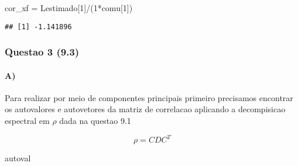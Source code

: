 \documentclass[
]{article}
\newenvironment{Shaded}{\begin{snugshade}}{\end{snugshade}}
\newcommand{\AttributeTok}[1]{\textcolor[rgb]{0.77,0.63,0.00}{#1}}
\newcommand{\DecValTok}[1]{\textcolor[rgb]{0.00,0.00,0.81}{#1}}
\newcommand{\FunctionTok}[1]{\textcolor[rgb]{0.00,0.00,0.00}{#1}}
\newcommand{\NormalTok}[1]{#1}
\newcommand{\OtherTok}[1]{\textcolor[rgb]{0.56,0.35,0.01}{#1}}
\newcommand{\SpecialCharTok}[1]{\textcolor[rgb]{0.00,0.00,0.00}{#1}}
\begin{document}
\begin{Shaded}
\begin{Highlighting}[]
\NormalTok{cor\_xf }\OtherTok{=}\NormalTok{ Lestimado[}\DecValTok{1}\NormalTok{]}\SpecialCharTok{/}\NormalTok{(}\DecValTok{1}\SpecialCharTok{*}\NormalTok{comu[}\DecValTok{1}\NormalTok{])}
\end{Highlighting}
\end{Shaded}

\begin{verbatim}
## [1] -1.141896
\end{verbatim}

\newpage

\hypertarget{questao-3-9.3}{%
\subsubsection{Questao 3 (9.3)}\label{questao-3-9.3}}

\hypertarget{a-1}{%
\paragraph{A)}\label{a-1}}

Para realizar por meio de componentes principais primeiro precisamos
encontrar os autovalores e autovetores da matriz de correlacao aplicando
a decompisicao espectral em \(\rho\) dada na questao 9.1

\[
\rho = CDC^T
\]

\begin{Shaded}
\end{Shaded}

\begin{Shaded}
\begin{Highlighting}[]
\NormalTok{autoval}
\end{Highlighting}
\end{Shaded}
\end{document}
